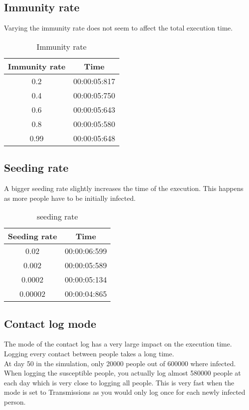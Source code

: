 \documentclass{article}
\begin{document}
\subsection{Immunity rate}
Varying the immunity rate does not seem to affect the total execution time.
\begin{table}[!h]
	\centering
	\begin{tabular}{|c|c|}
		\hline
		Immunity rate & Time \\\hline
    	0.2  & 00:00:05:817 \\\hline
    	0.4  & 00:00:05:750 \\\hline
    	0.6  & 00:00:05:643 \\\hline
    	0.8  & 00:00:05:580 \\\hline
    	0.99 & 00:00:05:648 \\
    	\hline
	\end{tabular}
	\caption{Immunity rate}
\end{table}

\subsection{Seeding rate}
A bigger seeding rate slightly increases the time of the execution. This happens as more people have to be initially infected.
\begin{table}[!h]
	\centering
	\begin{tabular}{|c|c|}
		\hline
		Seeding rate & Time \\\hline
    	0.02 	& 00:00:06:599 \\\hline
    	0.002 	& 00:00:05:589 \\\hline
    	0.0002 	& 00:00:05:134 \\\hline
  		0.00002 & 00:00:04:865 \\
    	\hline
	\end{tabular}
	\caption{seeding rate}
\end{table}

\subsection{Contact log mode}
The mode of the contact log has a very large impact on the execution time. Logging every contact between people takes a long time.\\
At day 50 in the simulation, only 20000 people out of 600000 where infected. When logging the susceptible people, you actually log almost 580000 people at each day which is very close to logging all people. This is very fast when the mode is set to Transmissions as you would only log once for each newly infected person.\\
\end{document}
